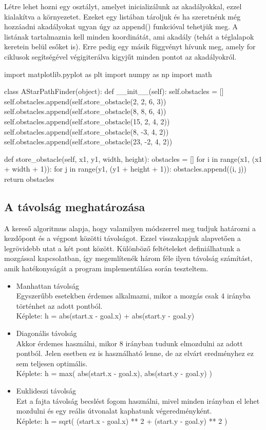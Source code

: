 Létre lehet hozni egy osztályt, amelyet inicializálunk az akadályokkal, ezzel kialakítva a környezetet. Ezeket egy listában tároljuk és ha szeretnénk még hozzáadni akadályokat ugyan úgy az append() funkcióval tehetjük meg. A listának tartalmaznia kell minden koordinátát, ami akadály (tehát a téglalapok keretein belül esőket is). Erre pedig egy másik függvényt hívunk meg, amely for ciklusok segítségével végigiterálva kigyjűt minden pontot az akadályokról. 

\begin{python}
import matplotlib.pyplot as plt
import numpy as np
import math


class AStarPathFinder(object):
    def __init__(self):
        self.obstacles = []
        self.obstacles.append(self.store_obstacle(2, 2, 6, 3))
        self.obstacles.append(self.store_obstacle(8, 8, 6, 4))
        self.obstacles.append(self.store_obstacle(15, 2, 4, 2))
        self.obstacles.append(self.store_obstacle(8, -3, 4, 2))
        self.obstacles.append(self.store_obstacle(23, -2, 4, 2))
        
 	def store_obstacle(self, x1, y1, width, height):
        obstacles = []
        for i in range(x1, (x1 + width + 1)):
            for j in range(y1, (y1 + height + 1)):
                obstacles.append((i, j))
        return obstacles
\end{python}

\subsection{A távolság meghatározása}

A kereső algoritmus alapja, hogy valamilyen módszerrel meg tudjuk határozni a kezdőpont és a végpont közötti távolságot. Ezzel visszakapjuk alapvetően a legrövidebb utat a két pont között. Különböző feltételeket definiálhatunk a mozgással kapcsolatban, így megemlítenék három féle ilyen távolság számítást, amik hatékonyságát a program implementálása során teszteltem.
\begin{itemize}
	\item Manhattan távolság\\
	Egyszerűbb esetekben érdemes alkalmazni, mikor a mozgás csak 4 irányba történhet az adott pontból. \\
	Képlete: h = abs(start.x - goal.x) + abs(start.y - goal.y)
	\item Diagonális távolság\\
	Akkor érdemes használni, mikor 8 irányban tudunk elmozdulni az adott pontból. Jelen esetben ez is használható lenne, de az elvárt eredményhez ez sem teljesen optimális.\\
	Képlete: h = max( abs(start.x - goal.x), abs(start.y - goal.y) )
	\item Euklideszi távolság\\
	Ezt a fajta távolság becslést fogom használni, mivel minden irányban el lehet mozdulni és egy reális útvonalat kaphatunk végeredményként.\\
	Képlete: h = sqrt( (start.x - goal.x) ** 2 + (start.y - goal.y) ** 2 )
\end{itemize}

